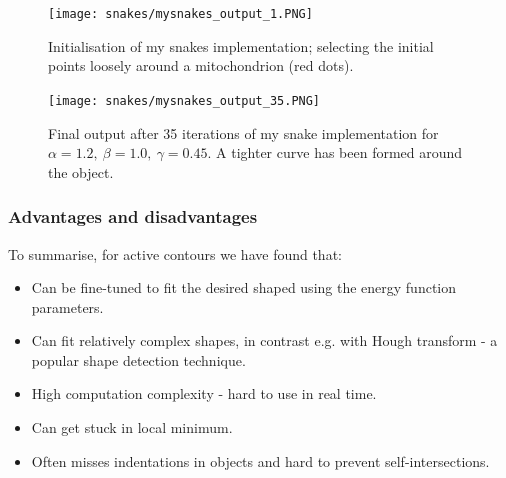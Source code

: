 \documentclass[a4paper]{article}
\begin{document}
\begin{multicols}{2}
\begin{figure}[H]
	\centering %
    	\texttt{[image: snakes/mysnakes\_output\_1.PNG]}
    \caption{Initialisation of my snakes implementation; selecting the initial points loosely around a mitochondrion (red dots).}
\end{figure}
\columnbreak
\begin{figure}[H]
	\centering %
    	\texttt{[image: snakes/mysnakes\_output\_35.PNG]}
    \caption{Final output after 35 iterations of my snake implementation for $\alpha=1.2, \ \beta = 1.0,\  \gamma = 0.45$. A tighter curve has been formed around the object.}
\end{figure}
\end{multicols}

\subsubsection{Advantages and disadvantages}
To summarise, for active contours we have found that:
\begin{multicols}{2}
    \begin{itemize}
        \item[\textcolor{DarkPink}{\ding{51}}] Can be fine-tuned to fit the desired shaped using the energy function parameters.
        \item[\textcolor{DarkPink}{\ding{51}}] Can fit relatively complex shapes, in contrast e.g. with Hough transform - a popular shape detection technique.
    \end{itemize}
    
    \columnbreak
    \begin{itemize}
        \item[\textcolor{DarkPink}{\ding{55}}] High computation complexity - hard to use in real time.
        \item[\textcolor{DarkPink}{\ding{55}}] Can get stuck in local minimum.
        \item[\textcolor{DarkPink}{\ding{55}}] Often misses indentations in objects and hard to prevent self-intersections.
    \end{itemize}
\end{multicols}








\end{document}
